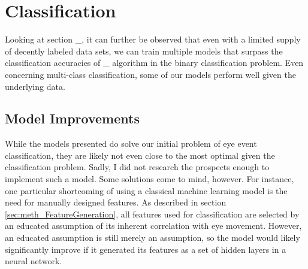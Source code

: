 \section{Classification} \label{sec:disc_Classification}

Looking at section \_, it can further be observed that even with a limited supply of decently labeled data sets, we can train multiple models that surpass the classification accuracies of \_ algorithm in the binary classification problem. Even concerning multi-class classification, some of our models perform well given the underlying data. 

\subsection{Model Improvements}
While the models presented do solve our initial problem of eye event classification, they are likely not even close to the most optimal given the classification problem. Sadly, I did not research the prospects enough to implement such a model. Some solutions come to mind, however. For instance, one particular shortcoming of using a classical machine learning model is the need for manually designed features. As described in section \ref{sec:meth_FeatureGeneration}, all features used for classification are selected by an educated assumption of its inherent correlation with eye movement. However, an educated assumption is still merely an assumption, so 
the model would likely significantly improve if it generated its features as a set of hidden layers in a neural network.

